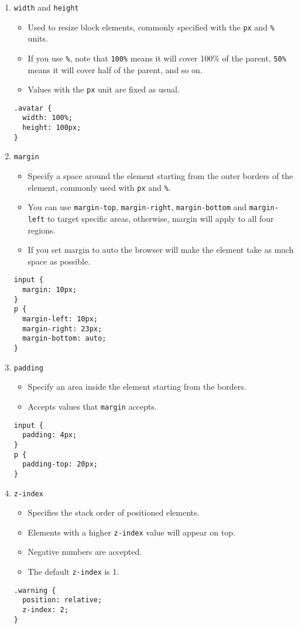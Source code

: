 \documentclass[10pt, twocolumn]{article}
\begin{document}
\begin{enumerate}
\item{\texttt{width} and \texttt{height}}
\begin{itemize}
    \item Used to resize block elements, commonly specified with the \texttt{px} and \texttt{\%} units.  
    \item If you use \texttt{\%}, note that \texttt{100\%} means it will cover 100\% of the parent, \texttt{50\%} means it will cover half of the parent, and so on.  
    \item Values with the \texttt{px} unit are fixed as usual.
\end{itemize}    
\begin{lstlisting}[frame=single]
.avatar {
  width: 100%;
  height: 100px;
}
\end{lstlisting}
    
\item{\texttt{margin}}
\begin{itemize}
    \item Specify a space around the element starting from the outer borders of the element, commonly used with \texttt{px} and \texttt{\%}.  
    \item You can use \texttt{margin-top}, \texttt{margin-right}, \texttt{margin-bottom} and \texttt{margin-left} to target specific areas, otherwise, margin will apply to all four regions.
    \item If you set margin to auto the browser will make the element take as much space as possible.
\end{itemize}    
\begin{lstlisting}[frame=single]
input {
  margin: 10px; 
}
p {
  margin-left: 10px;
  margin-right: 23px;
  margin-bottom: auto;
}
\end{lstlisting}
    
\item{\texttt{padding}}
\begin{itemize}
    \item Specify an area inside the element starting from the borders.
    \item Accepts values that \texttt{margin} accepts.
\end{itemize}    
\begin{lstlisting}[frame=single]
input {
  padding: 4px;
}
p {
  padding-top: 20px;
}
\end{lstlisting}
\item{\texttt{z-index}}
\begin{itemize}
    \item Specifies the stack order of positioned elements.  
    \item Elements with a higher \texttt{z-index} value will appear on top.  
    \item Negative numbers are accepted.  
    \item The default \texttt{z-index} is 1.
\end{itemize}    
\begin{lstlisting}[frame=single]
.warning {
  position: relative;
  z-index: 2;
}
\end{lstlisting}


\end{enumerate}
\end{document}
